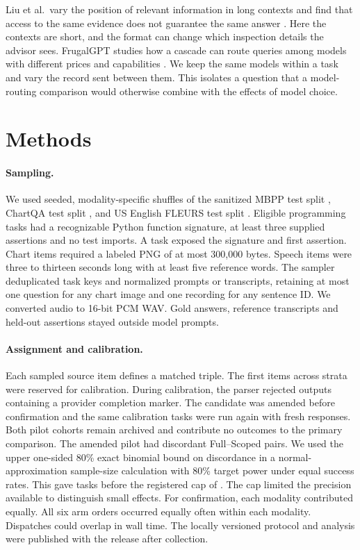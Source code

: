 \documentclass[10pt]{article}
\begin{document}
Liu et al.\ vary the position of relevant information in long contexts and find that access to the same evidence does not guarantee the same answer \cite{middle}. Here the contexts are short, and the format can change which inspection details the advisor sees. FrugalGPT studies how a cascade can route queries among models with different prices and capabilities \cite{frugal}. We keep the same models within a task and vary the record sent between them. This isolates a question that a model-routing comparison would otherwise combine with the effects of model choice.

\section{Methods}
\paragraph{Sampling.}
We used seeded, modality-specific shuffles of the sanitized MBPP test split \cite{mbpp}, ChartQA test split \cite{chartqa}, and US English FLEURS test split \cite{fleurs}. Eligible programming tasks had a recognizable Python function signature, at least three supplied assertions and no test imports. A task exposed the signature and first assertion. Chart items required a labeled PNG of at most 300,000 bytes. Speech items were three to thirteen seconds long with at least five reference words. The sampler deduplicated task keys and normalized prompts or transcripts, retaining at most one question for any chart image and one recording for any sentence ID. We converted audio to 16-bit PCM WAV. Gold answers, reference transcripts and held-out assertions stayed outside model prompts.

\paragraph{Assignment and calibration.}
Each sampled source item defines a matched triple. The first \PilotN{} items across strata were reserved for calibration. During calibration, the parser rejected outputs containing a provider completion marker. The candidate was amended before confirmation and the same calibration tasks were run again with fresh responses. Both pilot cohorts remain archived and contribute no outcomes to the primary comparison. The amended pilot had \PilotDiscordant{} discordant Full--Scoped pairs. We used the upper one-sided 80\% exact binomial bound on discordance in a normal-approximation sample-size calculation with 80\% target power under equal success rates. This gave \DesignTarget{} tasks before the registered cap of \StudyN{}. The cap limited the precision available to distinguish small effects. For confirmation, each modality contributed equally. All six arm orders occurred equally often within each modality. Dispatches could overlap in wall time. The locally versioned protocol and analysis were published with the release after collection.
\end{document}
